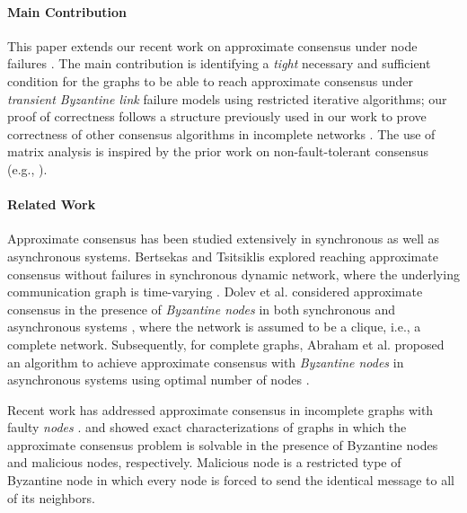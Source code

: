 \documentclass{llncs}
\begin{document}
\paragraph{Main Contribution}

This paper extends our recent work on approximate consensus under node failures \cite{vaidya_PODC12,Tseng_general}. The main contribution is identifying a {\em tight} necessary and sufficient condition for the graphs to be able to reach approximate consensus under {\em transient Byzantine link} failure models \cite{Santoro_link,Santoro_link2} using restricted iterative algorithms; our proof of correctness follows a structure previously used in our work to prove correctness of other consensus algorithms in incomplete networks \cite{Tseng_general,vaidya_icdcn14}. The use of matrix analysis is inspired by the prior work on non-fault-tolerant consensus (e.g., \cite{Jadbabaie,AA_convergence_markov}).



\paragraph{Related Work}

Approximate consensus has been studied extensively in synchronous as well as asynchronous systems. Bertsekas and Tsitsiklis explored reaching approximate consensus without failures in synchronous dynamic network, where the underlying communication graph is time-varying \cite{AA_convergence_markov}. Dolev et al. considered approximate consensus in the presence of {\em Byzantine nodes} in both synchronous and asynchronous systems \cite{AA_Dolev_1986}, where the network is assumed to be a clique, i.e., a complete network. Subsequently, for complete graphs, Abraham et al. proposed an algorithm to achieve approximate consensus with {\em Byzantine nodes} in asynchronous systems using optimal number of nodes \cite{AA_optimal}. 

Recent work has addressed approximate consensus in incomplete graphs with faulty {\em nodes} \cite{vaidya_PODC12,Sundaram_condition,Tseng_general}. \cite{vaidya_PODC12,Tseng_general} and \cite{Sundaram_condition} showed exact characterizations of graphs in which the approximate consensus problem is solvable in the presence of Byzantine nodes and malicious nodes, respectively. Malicious node is a restricted type of Byzantine node in which every node is forced to send the identical message to all of its neighbors. 
\end{document}
